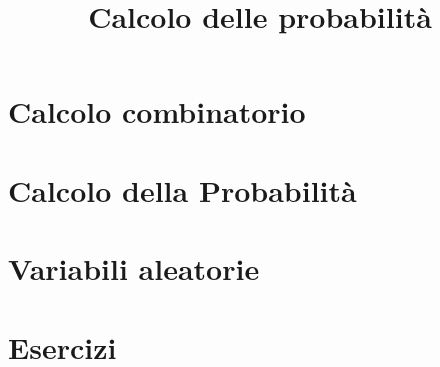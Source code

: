 



\title{Calcolo delle probabilit\`a}

\maketitle

\newpage

\tableofcontents
\newpage

\chapter{Calcolo combinatorio}



\newpage

\chapter{Calcolo della Probabilit\`a}



\newpage

\chapter{Variabili aleatorie}



\newpage

\chapter{Esercizi}



